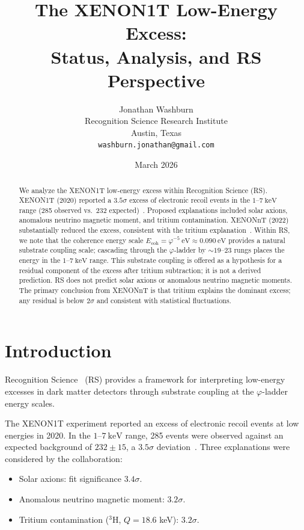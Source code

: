 \documentclass[12pt,a4paper]{article}
\title{The XENON1T Low-Energy Excess:\\
Status, Analysis, and RS Perspective}
\author{Jonathan Washburn\\
Recognition Science Research Institute\\
Austin, Texas\\
\texttt{washburn.jonathan@gmail.com}}
\date{March 2026}
\theoremstyle{definition}
\theoremstyle{remark}
\begin{document}
\maketitle

\begin{abstract}
We analyze the XENON1T low-energy excess within Recognition Science
(RS).  XENON1T (2020) reported a $3.5\sigma$ excess of electronic
recoil events in the $1$--$7~\mathrm{keV}$ range (285 observed
vs.\ 232 expected)~\cite{XENON2020}.  Proposed explanations included
solar axions, anomalous neutrino magnetic moment, and tritium
contamination.  XENONnT (2022) substantially reduced the excess,
consistent with the tritium explanation~\cite{XENONnT2022}.  Within
RS, we note that the coherence energy scale $E_{\mathrm{coh}} =
\varphi^{-5}~\mathrm{eV} \approx 0.090~\mathrm{eV}$ provides a
natural substrate coupling scale; cascading through the $\varphi$-ladder
by $\sim 19$--$23$ rungs places the energy in the $1$--$7~\mathrm{keV}$
range.  This substrate coupling is offered as a hypothesis for a
residual component of the excess after tritium subtraction; it is not
a derived prediction.  RS does not predict solar axions or anomalous
neutrino magnetic moments.  The primary conclusion from XENONnT is that
tritium explains the dominant excess; any residual is below $2\sigma$
and consistent with statistical fluctuations.
\end{abstract}

\section{Introduction}
\label{sec:intro}

Recognition Science~\cite{RS_Axioms} (RS) provides a framework for
interpreting low-energy excesses in dark matter detectors through
substrate coupling at the $\varphi$-ladder energy scales.

The XENON1T experiment reported an excess of electronic recoil events
at low energies in 2020.  In the $1$--$7~\mathrm{keV}$ range, 285
events were observed against an expected background of $232 \pm 15$,
a $3.5\sigma$ deviation~\cite{XENON2020}.  Three explanations were
considered by the collaboration:
\begin{itemize}[nosep]
  \item Solar axions: fit significance $3.4\sigma$.
  \item Anomalous neutrino magnetic moment: $3.2\sigma$.
  \item Tritium contamination ($^3$H, $Q = 18.6$ keV): $3.2\sigma$.
\end{itemize}
\end{document}
